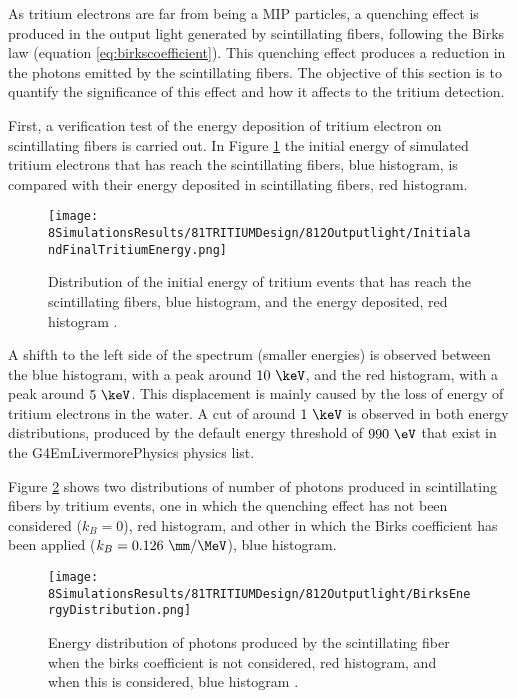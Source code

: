 As tritium electrons are far from being a MIP particles, a quenching effect is produced in the output light generated by scintillating fibers, following the Birks law (equation \ref{eq:birkscoefficient}). This quenching effect produces a reduction in the photons emitted by the scintillating fibers. The objective of this section is to quantify the significance of this effect and how it affects to the tritium detection.

First, a verification test of the energy deposition of tritium electron on scintillating fibers is carried out. In Figure \ref{fig:InitialFinalTritiumEnergy} the initial energy of simulated tritium electrons that has reach the scintillating fibers, blue histogram, is compared with their energy deposited in scintillating fibers, red histogram.

\begin{figure}[h]
\centering
\texttt{[image: 8SimulationsResults/81TRITIUMDesign/812Outputlight/InitialandFinalTritiumEnergy.png]}
\caption{Distribution of the initial energy of tritium events that has reach the scintillating fibers, blue histogram, and the energy deposited, red histogram \cite{SimulationPaperCarlos}.\label{fig:InitialFinalTritiumEnergy}}
\end{figure}

A shifth to the left side of the spectrum (smaller energies) is observed between the blue histogram, with a peak around $10~\keV$, and the red histogram, with a peak around $5~\keV$. This displacement is mainly caused by the loss of energy of tritium electrons in the water. A cut of around $1~\keV$ is observed in both energy distributions, produced by the default energy threshold of $990~\eV$ that exist in the G4EmLivermorePhysics physics list.

Figure \ref{fig:BirksEffectinEnergyDistribution} shows two distributions of number of photons produced in scintillating fibers by tritium events, one in which the quenching effect has not been considered ($k_B=0$), red histogram, and other in which the Birks coefficient has been applied ($k_B=0.126~\mm/\MeV$), blue histogram.

\begin{figure}[h]
\centering
\texttt{[image: 8SimulationsResults/81TRITIUMDesign/812Outputlight/BirksEnergyDistribution.png]}
\caption{Energy distribution of photons produced by the scintillating fiber when the birks coefficient is not considered, red histogram, and when this is considered, blue histogram \cite{SimulationPaperCarlos}.\label{fig:BirksEffectinEnergyDistribution}}
\end{figure}  

